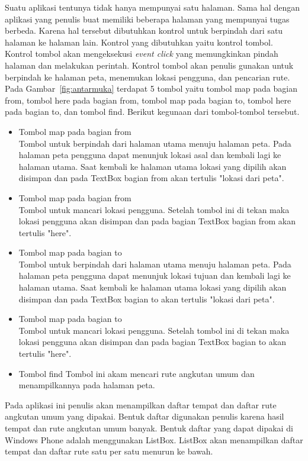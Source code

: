 \hspace{0.5cm} Suatu aplikasi tentunya tidak hanya mempunyai satu halaman. Sama hal dengan aplikasi yang penulis buat memiliki beberapa halaman yang mempunyai tugas berbeda. Karena hal tersebut dibutuhkan kontrol untuk berpindah dari satu halaman ke halaman lain. Kontrol yang dibutuhkan yaitu kontrol tombol. Kontrol tombol akan mengeksekusi \textit{event click} yang memungkinkan pindah halaman dan melakukan perintah. Kontrol tombol akan penulis gunakan untuk berpindah ke halaman peta, menemukan lokasi pengguna, dan pencarian rute. Pada Gambar~\ref{fig:antarmuka} terdapat 5 tombol yaitu tombol map pada bagian from, tombol here pada bagian from, tombol map pada bagian to, tombol here pada bagian to, dan tombol find. Berikut kegunaan dari tombol-tombol tersebut.
\begin{itemize}
	\item Tombol map pada bagian from\\
	Tombol untuk berpindah dari halaman utama menuju halaman peta. Pada halaman peta pengguna dapat menunjuk lokasi asal dan kembali lagi ke halaman utama. Saat kembali ke halaman utama lokasi yang dipilih akan disimpan dan pada TextBox bagian from akan tertulis "lokasi dari peta".
	\item Tombol map pada bagian from\\
	Tombol untuk mancari lokasi pengguna. Setelah tombol ini di tekan maka lokasi pengguna akan disimpan dan pada bagian TextBox bagian from akan tertulis "here".
	\item Tombol map pada bagian to\\
	Tombol untuk berpindah dari halaman utama menuju halaman peta. Pada halaman peta pengguna dapat menunjuk lokasi tujuan dan kembali lagi ke halaman utama. Saat kembali ke halaman utama lokasi yang dipilih akan disimpan dan pada TextBox bagian to akan tertulis "lokasi dari peta".
	\item Tombol map pada bagian to\\
	Tombol untuk mancari lokasi pengguna. Setelah tombol ini di tekan maka lokasi pengguna akan disimpan dan pada bagian TextBox bagian to akan tertulis "here".
	\item Tombol find 
	Tombol ini akam mencari rute angkutan umum dan menampilkannya pada halaman peta.
\end{itemize}

\hspace{0.5cm} Pada aplikasi ini penulis akan menampilkan daftar tempat dan daftar rute angkutan umum yang dipakai. Bentuk daftar digunakan penulis karena hasil tempat dan rute angkutan umum banyak. Bentuk daftar yang dapat dipakai di Windows Phone adalah menggunakan ListBox. ListBox akan menampilkan daftar tempat dan daftar rute satu per satu menurun ke bawah.

